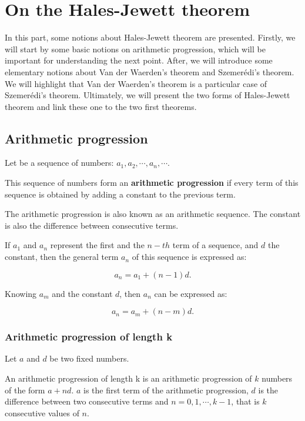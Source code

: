 \chapter{On the Hales-Jewett theorem}

In this part, some notions about Hales-Jewett theorem are presented. Firstly, we will start by some basic notions on arithmetic progression, which will be important for understanding the next point. After, we will introduce some elementary notions about  Van der Waerden’s theorem and  Szemerédi's theorem. We will highlight that  Van der Waerden's theorem is a particular case of Szemerédi's theorem. Ultimately, we will present the two forms of Hales-Jewett theorem and link these one to the two first theorems.

\section{Arithmetic progression}


\begin{defn}
Let be a sequence of numbers: $a_1, a_2, \cdots, a_n, \cdots.$ 

This sequence of numbers form an \textbf{arithmetic progression} if every term of this sequence is obtained by adding a constant to the previous term.
\end{defn}
The arithmetic progression is also known as an arithmetic sequence. The constant is also the difference between consecutive terms.

If $a_1$ and $a_n$ represent the first and the $n-th$ term of a sequence, and $d$ the constant, then the general term $a_n$ of this sequence is expressed as:

$$a_n=a_1+(n-1)d.$$

Knowing $a_m$ and the constant $d$, then $a_n$ can be expressed as:
 
$$a_n=a_m+(n-m)d.$$

\subsection{Arithmetic progression of length k}


Let $a$ and $d$ be two fixed numbers.

An arithmetic progression of length k is an arithmetic progression of $k$ numbers of the form $a+nd.$ $a$ is the first term of the arithmetic progression, $d$ is the difference between two consecutive terms and $n=0,1, \cdots, k-1$, that is $k$ consecutive values of $n.$ 

